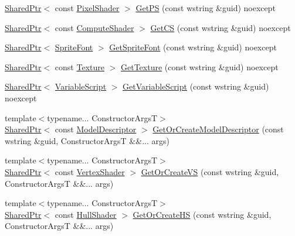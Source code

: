 \begin{DoxyCompactItemize}
\item 
\hyperlink{namespacemage_a1e01ae66713838a7a67d30e44c67703e}{Shared\+Ptr}$<$ const \hyperlink{namespacemage_ac98506b7edd999ea43ec46fbd0330238}{Pixel\+Shader} $>$ \hyperlink{classmage_1_1_resource_manager_acf32120f85d46e82d2ddcfc8fe66bea7}{Get\+PS} (const wstring \&guid) noexcept
\item 
\hyperlink{namespacemage_a1e01ae66713838a7a67d30e44c67703e}{Shared\+Ptr}$<$ const \hyperlink{namespacemage_af219172e81f21ea8002b17b1efbb25e0}{Compute\+Shader} $>$ \hyperlink{classmage_1_1_resource_manager_a87967af3f0896373023c858db4a8307b}{Get\+CS} (const wstring \&guid) noexcept
\item 
\hyperlink{namespacemage_a1e01ae66713838a7a67d30e44c67703e}{Shared\+Ptr}$<$ \hyperlink{classmage_1_1_sprite_font}{Sprite\+Font} $>$ \hyperlink{classmage_1_1_resource_manager_a6ad7dc799e076da85d4638380b1838ff}{Get\+Sprite\+Font} (const wstring \&guid) noexcept
\item 
\hyperlink{namespacemage_a1e01ae66713838a7a67d30e44c67703e}{Shared\+Ptr}$<$ const \hyperlink{classmage_1_1_texture}{Texture} $>$ \hyperlink{classmage_1_1_resource_manager_a2e2f86c3ab9c91900e8f10b94cafb06a}{Get\+Texture} (const wstring \&guid) noexcept
\item 
\hyperlink{namespacemage_a1e01ae66713838a7a67d30e44c67703e}{Shared\+Ptr}$<$ \hyperlink{classmage_1_1_variable_script}{Variable\+Script} $>$ \hyperlink{classmage_1_1_resource_manager_ac54eb6fd61322a66bdc704a88eca192d}{Get\+Variable\+Script} (const wstring \&guid) noexcept
\item 
{\footnotesize template$<$typename... Constructor\+ArgsT$>$ }\\\hyperlink{namespacemage_a1e01ae66713838a7a67d30e44c67703e}{Shared\+Ptr}$<$ const \hyperlink{classmage_1_1_model_descriptor}{Model\+Descriptor} $>$ \hyperlink{classmage_1_1_resource_manager_a02e823df69a151f8a2642bd3ff3140c2}{Get\+Or\+Create\+Model\+Descriptor} (const wstring \&guid, Constructor\+ArgsT \&\&... args)
\item 
{\footnotesize template$<$typename... Constructor\+ArgsT$>$ }\\\hyperlink{namespacemage_a1e01ae66713838a7a67d30e44c67703e}{Shared\+Ptr}$<$ const \hyperlink{classmage_1_1_vertex_shader}{Vertex\+Shader} $>$ \hyperlink{classmage_1_1_resource_manager_ab1a1a4d7e577707b6edf0e068d6c1bff}{Get\+Or\+Create\+VS} (const wstring \&guid, Constructor\+ArgsT \&\&... args)
\item 
{\footnotesize template$<$typename... Constructor\+ArgsT$>$ }\\\hyperlink{namespacemage_a1e01ae66713838a7a67d30e44c67703e}{Shared\+Ptr}$<$ const \hyperlink{namespacemage_a6705043f61391313d099f89ee3cc94ee}{Hull\+Shader} $>$ \hyperlink{classmage_1_1_resource_manager_a7cfe4718a6efd82947368133335bcb47}{Get\+Or\+Create\+HS} (const wstring \&guid, Constructor\+ArgsT \&\&... args)

\end{DoxyCompactItemize}

